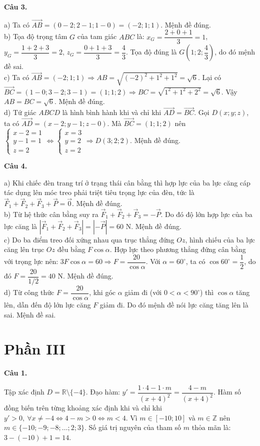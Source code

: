 \documentclass[12pt,a4paper]{article}
\newcommand{\loigiai}[1]{\par\medskip\Needspace{4\baselineskip}\noindent\textbf{#1}\par\nobreak}
\begin{document}
\loigiai{Câu 3.}
a) Ta có $\vec{AB}=(0-2;2-1;1-0)=(-2;1;1)$. Mệnh đề đúng.\\
b) Tọa độ trọng tâm $G$ của tam giác $ABC$ là:
$x_G=\dfrac{2+0+1}{3}=1$, $y_G=\dfrac{1+2+3}{3}=2$, $z_G=\dfrac{0+1+3}{3}=\dfrac{4}{3}$.
Tọa độ đúng là $G\left(1;2;\dfrac{4}{3}\right)$, do đó mệnh đề sai.\\
c) Ta có $\vec{AB}=(-2;1;1)\Rightarrow AB=\sqrt{(-2)^2+1^2+1^2}=\sqrt{6}$.
Lại có $\vec{BC}=(1-0;3-2;3-1)=(1;1;2)\Rightarrow BC=\sqrt{1^2+1^2+2^2}=\sqrt{6}$.
Vậy $AB=BC=\sqrt{6}$. Mệnh đề đúng.\\
d) Tứ giác $ABCD$ là hình bình hành khi và chỉ khi $\vec{AD}=\vec{BC}$.
Gọi $D(x;y;z)$, ta có $\vec{AD}=(x-2;y-1;z-0)$.
Mà $\vec{BC}=(1;1;2)$ nên $\begin{cases}x-2=1\\y-1=1\\z=2\end{cases}\Leftrightarrow\begin{cases}x=3\\y=2\\z=2\end{cases}\Rightarrow D(3;2;2)$. Mệnh đề đúng.

\loigiai{Câu 4.}
a) Khi chiếc đèn trang trí ở trạng thái cân bằng thì hợp lực của ba lực căng cáp tác dụng lên móc treo phải triệt tiêu trọng lực của đèn, tức là $\vec{F}_1+\vec{F}_2+\vec{F}_3+\vec{P}=\vec{0}$. Mệnh đề đúng.\\
b) Từ hệ thức cân bằng suy ra $\vec{F}_1+\vec{F}_2+\vec{F}_3=-\vec{P}$.
Do đó độ lớn hợp lực của ba lực căng là $|\vec{F}_1+\vec{F}_2+\vec{F}_3|=|-\vec{P}|=60\text{ N}$. Mệnh đề đúng.\\
c) Do ba điểm treo đối xứng nhau qua trục thẳng đứng $Oz$, hình chiếu của ba lực căng lên trục $Oz$ đều bằng $F\cos\alpha$.
Hợp lực theo phương thẳng đứng cân bằng với trọng lực nên:
$3F\cos\alpha=60\Rightarrow F=\dfrac{20}{\cos\alpha}$.
Với $\alpha=60^\circ$, ta có $\cos 60^\circ=\dfrac{1}{2}$, do đó $F=\dfrac{20}{1/2}=40\text{ N}$. Mệnh đề đúng.\\
d) Từ công thức $F=\dfrac{20}{\cos\alpha}$, khi góc $\alpha$ giảm đi (với $0<\alpha<90^\circ$) thì $\cos\alpha$ tăng lên, dẫn đến độ lớn lực căng $F$ giảm đi. Do đó mệnh đề nói lực căng tăng lên là sai. Mệnh đề sai.

\newpage
\section*{\large Phần III}
\loigiai{Câu 1.}
Tập xác định $D=\mathbb{R}\setminus\{-4\}$.
Đạo hàm: $y'=\dfrac{1\cdot 4-1\cdot m}{(x+4)^2}=\dfrac{4-m}{(x+4)^2}$.
Hàm số đồng biến trên từng khoảng xác định khi và chỉ khi $y'>0,\ \forall x\ne -4\Leftrightarrow 4-m>0\Leftrightarrow m<4$.
Vì $m\in[-10;10]$ và $m\in\mathbb{Z}$ nên $m\in\{-10;-9;-8;\dots;2;3\}$.
Số giá trị nguyên của tham số $m$ thỏa mãn là:
$3-(-10)+1=14$.
\end{document}
